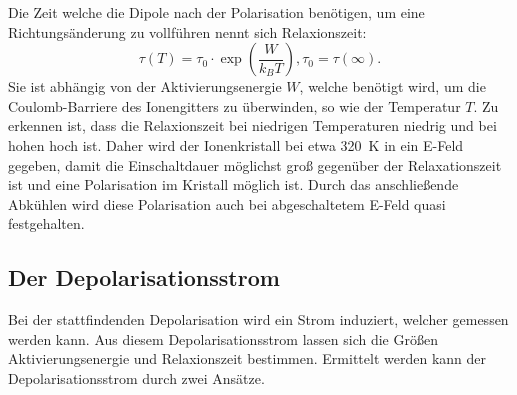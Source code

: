 Die Zeit welche die Dipole nach der Polarisation benötigen,
um eine Richtungsänderung zu vollführen nennt sich Relaxionszeit:
\begin{equation}
    \tau(T) = \tau_0 \cdot \exp\left(\frac{W}{k_B T}\right) , \tau_0 =\tau(\infty).
    \label{eq:Relax}
\end{equation}
Sie ist abhängig von der Aktivierungsenergie $W$,
welche benötigt wird,
um die Coulomb-Barriere des Ionengitters zu überwinden,
so wie der Temperatur $T$.
Zu erkennen ist,
dass die Relaxionszeit bei niedrigen Temperaturen niedrig und bei hohen hoch ist.
Daher wird der Ionenkristall bei etwa \qty{320}{\kelvin} in ein E-Feld gegeben,
damit die Einschaltdauer möglichst groß gegenüber der Relaxationszeit ist und eine Polarisation im Kristall möglich ist.
Durch das anschließende Abkühlen wird diese Polarisation auch bei abgeschaltetem E-Feld quasi festgehalten. 



\subsection{Der Depolarisationsstrom}
Bei der stattfindenden Depolarisation wird ein Strom induziert,
welcher gemessen werden kann. 
Aus diesem Depolarisationsstrom lassen sich die Größen Aktivierungsenergie und Relaxionszeit bestimmen.
Ermittelt werden kann der Depolarisationsstrom durch zwei Ansätze.


